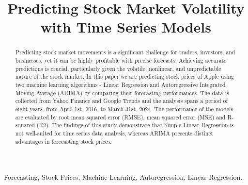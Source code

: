 \documentclass[conference,onecolumn,11pt]{IEEEtran}
\begin{document}
\title{Predicting Stock Market Volatility with Time Series Models\\
}

\author{
\and
{}
}

\maketitle

\begin{abstract}
Predicting stock market movements is a significant challenge for traders, investors, and businesses, yet it can be highly profitable with precise forecasts. Achieving accurate predictions is crucial, particularly given the volatile, nonlinear, and unpredictable nature of the stock market. In this paper we are predicting stock prices of Apple using two machine learning algorithms - Linear Regression and Autoregressive Integrated Moving Average (ARIMA) by comparing their forecasting performances. The data is collected from Yahoo Finance and Google Trends and the analysis spans a period of eight years, from April 1st, 2016, to March 31st, 2024. The performance of the models are evaluated by root mean squared error (RMSE), mean squared error (MSE) and R-squared (R2). The findings of this study demonstrate that Simple Linear Regression is not well-suited for time series data analysis, whereas ARIMA presents distinct advantages in forecasting stock prices.

\end{abstract}

\begin{IEEEkeywords}
Forecasting, Stock Prices, Machine Learning, Autoregression, Linear Regression. 
\end{IEEEkeywords}
\end{document}
